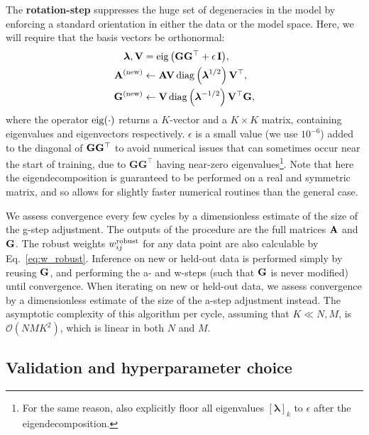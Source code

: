 \documentclass[onecolumn,floatfix,linenumbers,trackchanges]{aastex631}
\DeclareMathOperator{\eig}{eig}
\begin{document}
The \textbf{rotation-step} suppresses the huge set of degeneracies in the model by enforcing a standard orientation in either the data or the model space. Here, we will require that the basis vectors be orthonormal:
\begin{align}
    \boldsymbol{\lambda}, {\bf V} &= \eig{\left( {\bf G} {\bf G}^\top + \epsilon {\bf \, I}\right)},\\
    {\bf A}^{\rm (new)} &\leftarrow {\bf A} {\bf V} \, {\rm diag} \left(\boldsymbol{\lambda}^{1/2} \right) {\bf V}^\top, \\
    {\bf G}^{\rm (new)} &\leftarrow {\bf V} \, {\rm diag} \left(\boldsymbol{\lambda}^{-1/2}\right)  {\bf V}^\top {\bf G},
\end{align}
where the operator ${\rm eig}(\cdot)$ returns a $K$-vector and a $K\times K$ matrix, containing eigenvalues and eigenvectors respectively.
$\epsilon$ is a small value (we use $10^{-6}$) added to the diagonal of ${\bf G} {\bf G}^\top$ to avoid numerical issues that can sometimes occur near the start of training, due to $\mathbf{G}\mathbf{G}^\top$ having near-zero eigenvalues\footnote{For the same reason, also explicitly floor all eigenvalues $[\boldsymbol{\lambda}]_k$ to $\epsilon$ after the eigendecomposition.}.
Note that here the eigendecomposition is guaranteed to be performed on a real and symmetric matrix, and so allows for slightly faster numerical routines than the general case.

We assess convergence every few cycles by a dimensionless estimate of the size of the g-step adjustment.
The outputs of the procedure are the full matrices ${\bf A}$ and ${\bf G}$.
The robust weights $w^{\rm robust}_{ij}$ for any data point are also calculable by Eq.~\eqref{eq:w_robust}.
Inference on new or held-out data is performed simply by reusing ${\bf G}$, and performing the a- and w-steps (such that ${\bf G}$ is never modified) until convergence.
When iterating on new or held-out data, we assess convergence by a dimensionless estimate of the size of the a-step adjustment instead.
The asymptotic complexity of this algorithm per cycle, assuming that $K \ll N, M$, is $\mathcal{O}(NMK^2)$, which is linear in both $N$ and $M$.

\subsection{Validation and hyperparameter choice} \label{sec:cv}
\end{document}
